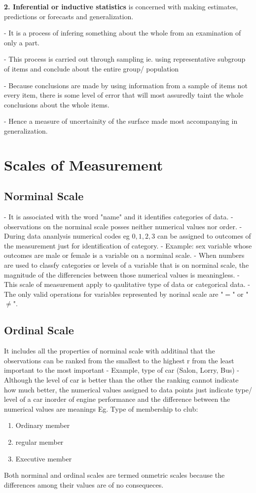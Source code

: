 \documentclass[12pt,a4paper]{article}
\begin{document}
\textbf{2. Inferential or inductive statistics} is concerned with making estimates, predictions or forecasts and generalization.

- It is  a process of infering something about the whole from an examination of only a part.

- This process is carried out through sampling ie. using representative subgroup of items and conclude about the entire group/ population

- Because conclusions are made by using information from a sample of items not every item, there is some level of error that will most assuredly taint the whole conclusions about the whole items.

- Hence a measure of uncertainity of the surface made most accompanying in generalization.

\section{Scales of Measurement}

\subsection{Norminal Scale}
- It is associated with the word "name" and it identifies categories of data.
- observations on the norminal scale posses neither numerical values nor order.
- During data ananlysis numerical codes eg $0, 1, 2, 3$ can be assigned to outcomes of the measurement just for identification of category.
- Example: sex variable whose outcomes are male or female is a variable on a norminal scale.
- When numbers are used to classfy categories or levels of a variable that is on norminal scale, the magnitude of the differencies between those numerical values is meaningless.
-This scale of measurement apply to qaulitative type of data or categorical data.
- The only valid operations for variables represented by norinal scale are "$=$" or "$\neq$".
\subsection{Ordinal Scale}
It includes all the properties of norminal scale with additinal that the observations can be ranked from the smallest to the highest r from the least important to the most important
- Example, type of car (Salon, Lorry, Bus)
- Although the level of car is better than the other the ranking cannot indicate how much better, the numerical values assigned to data points just indicate type/ level of a car inorder of engine performance and the difference between the numerical values are meanings Eg. Type of membership to club:
\begin{enumerate}
    \item Ordinary member
    \item regular member
    \item Executive member
\end{enumerate}
Both norminal and ordinal scales are termed onmetric scales because the differences among their values are of no consequeces.
\end{document}

